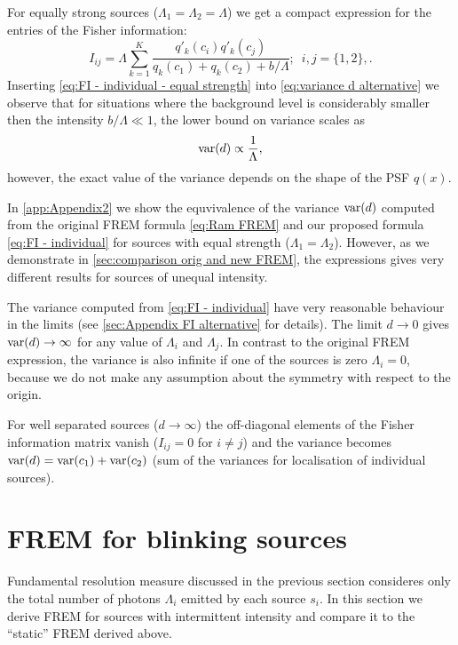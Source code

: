 For equally strong sources ($\Lambda_1=\Lambda_2=\Lambda$) we get a compact expression for the entries of the Fisher information: 
%
\begin{equation}
	I_{ij} =\Lambda\sum_{k=1}^{K}\frac{q'_k(c_i)q'_k(c_j)}{q_k(c_1)+q_k(c_2)+b/\Lambda};\; \ i,j=\{1,2\},.
	\label{eq:FI - individual - equal strength}
\end{equation}
%
Inserting \autoref{eq:FI - individual - equal strength} into \autoref{eq:variance d alternative} we observe that for situations where the background level is considerably smaller then the intensity $b/\Lambda\ll1$, the lower bound on variance scales as
%
\begin{equation}
	\mathrm{var}(d)\propto\frac{1}{\Lambda}, 
\end{equation}
%
however, the exact value of the variance depends on the shape of the PSF $q(x)$.

In \autoref{app:Appendix2} we show the equvivalence of the variance $\mathrm{var}(d)$ computed from the original FREM formula \autoref{eq:Ram FREM} and our proposed formula \autoref{eq:FI - individual} for sources with equal strength ($\Lambda_1=\Lambda_2$). However, as we demonstrate in \autoref{sec:comparison orig and new FREM}, the expressions gives very different results for sources of unequal intensity. 

The variance computed from \autoref{eq:FI - individual} have very reasonable behaviour in the limits (see \autoref{sec:Appendix FI alternative} for details). The limit $d\rightarrow0$ gives $\mathrm{var}(d)\rightarrow\infty$ for any value of $\Lambda_i$ and $\Lambda_j$. In contrast to the original FREM expression, the variance is also infinite if one of the sources is zero $\Lambda_i=0$, because we do not make any assumption about the symmetry with respect to the origin. 

For well separated sources ($d\rightarrow\infty$) the off-diagonal elements of the Fisher information matrix vanish ($I_{ij}=0$ for $i\neq j$) and the variance becomes $\mathrm{var}(d)=\mathrm{var}(c_1)+\mathrm{var}(c_2)$ (sum of the variances for localisation of individual sources).



\section{FREM for blinking sources\label{sec:FREM for blinking}}

Fundamental resolution measure discussed in the previous section consideres only the total number of photons $\Lambda_i$ emitted by each source $s_i$. In this section we derive FREM for sources with intermittent intensity and compare it to the ``static'' FREM derived above. 

